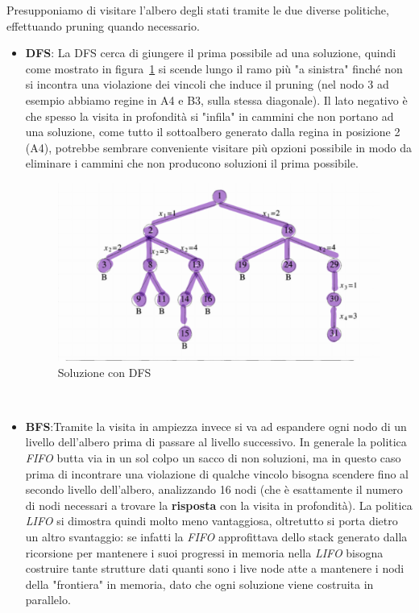 \documentclass[a4paper]{article}
\begin{document}
Presupponiamo di visitare l'albero degli stati tramite le due diverse politiche, effettuando pruning quando necessario.
\begin{itemize}
	\item \textbf{DFS}: La DFS cerca di giungere il prima possibile ad una soluzione, quindi come mostrato in figura~\ref{FIG:C_2_DFS} si scende lungo il ramo più "a sinistra" finché non si incontra una violazione dei vincoli che induce il pruning (nel nodo 3 ad esempio abbiamo regine in A4 e B3, sulla stessa diagonale).
		Il lato negativo è che spesso la visita in profondità si "infila" in cammini che non portano ad una soluzione, come tutto il sottoalbero generato dalla regina in posizione 2 (A4), potrebbe sembrare conveniente visitare più opzioni possibile in modo da eliminare i cammini che non producono soluzioni il prima possibile.
\begin{figure}[!ht]
\centering
\includegraphics[width=1\textwidth]{./img/C_2_DFS.png}
\caption{Soluzione con DFS} \label{FIG:C_2_DFS}
\end{figure}\\
	\item \textbf{BFS}:Tramite la visita in ampiezza invece si va ad espandere ogni nodo di un livello dell'albero prima di passare al livello successivo.
		In generale la politica \textit{FIFO} butta via in un sol colpo un sacco di non soluzioni, ma in questo caso prima di incontrare una violazione di qualche vincolo bisogna scendere fino al secondo livello dell'albero, analizzando 16 nodi (che è esattamente il numero di nodi necessari a trovare la \textbf{risposta} con la visita in profondità).
		La politica \textit{LIFO} si dimostra quindi molto meno vantaggiosa, oltretutto si porta dietro un altro svantaggio: se infatti la \textit{FIFO} approfittava dello stack generato dalla ricorsione per mantenere i suoi progressi in memoria nella \textit{LIFO} bisogna costruire tante strutture dati quanti sono i live node atte a mantenere i nodi della "frontiera" in memoria, dato che ogni soluzione viene costruita in parallelo.

\end{itemize}
\end{document}
